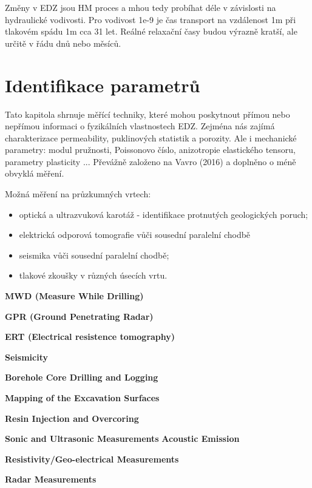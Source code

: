 \documentclass{article}
\begin{document}
Změny v EDZ jsou HM proces a mhou tedy probíhat déle v závislosti na hydraulické vodivosti. Pro vodivost 1e-9 je čas transport na vzdálenost 1m při tlakovém spádu 1m cca 31 let. Reálné relaxační časy budou výrazně kratší, ale určitě v řádu dnů nebo měsíců. 

\section{Identifikace parametrů}
\label{sec:parameters}

Tato kapitola shrnuje měřící techniky, které mohou poskytnout přímou nebo nepřímou informaci 
o fyzikálních vlastnostech EDZ. Zejména nás zajímá charakterizace permeability, puklinových statistik a porozity. Ale i mechanické parametry: modul pružnosti, Poissonovo číslo, anizotropie elastického tensoru,  parametry plasticity ...
Převážně založeno na Vavro (2016) \cite{Vavro2016} a doplněno o méně obvyklá měření.


Možná měření na průzkumných vrtech:
    \begin{itemize}
        \item optická a ultrazvuková karotáž - identifikace protnutých geologických poruch;
        \item elektrická odporová tomografie vůči sousední paralelní chodbě
        \item seismika vůči sousední paralelní chodbě;
        \item tlakové zkoušky v různých úsecích vrtu.
    \end{itemize}

{\bf MWD (Measure While Drilling)} \cite{JeroenvanEldert2018}

{\bf GPR (Ground Penetrating Radar)} 

{\bf ERT (Electrical resistence tomography)}


{\bf Seismicity}

{\bf  Borehole Core Drilling and Logging} \cite{Lanyon2011}

{\bf Mapping of the Excavation Surfaces} \cite{Lanyon2011}

{\bf  Resin Injection and Overcoring} \cite{Lanyon2011}

{\bf  Sonic and Ultrasonic Measurements} \cite{Lanyon2011}
{\bf  Acoustic Emission} \cite{Lanyon2011}

{\bf  Resistivity/Geo-electrical Measurements} \cite{Lanyon2011}

{\bf  Radar Measurements} \cite{Lanyon2011}
\end{document}

